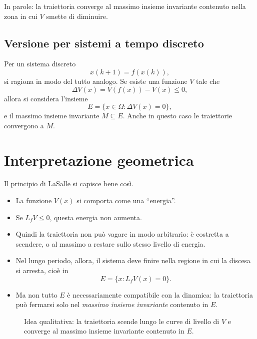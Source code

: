 \medskip

\noindent
In parole: la traiettoria converge al massimo insieme invariante contenuto nella zona in cui \(V\) smette di diminuire.

\subsection{Versione per sistemi a tempo discreto}

Per un sistema discreto
\[
x(k+1)=f(x(k)),
\]
si ragiona in modo del tutto analogo.  
Se esiste una funzione \(V\) tale che
\[
\Delta V(x)=V(f(x))-V(x)\le 0,
\]
allora si considera l'insieme
\[
E=\{x\in\Omega : \Delta V(x)=0\},
\]
e il massimo insieme invariante \(M\subseteq E\).  
Anche in questo caso le traiettorie convergono a \(M\).

\section{Interpretazione geometrica}

Il principio di LaSalle si capisce bene così.

\begin{itemize}
    \item La funzione \(V(x)\) si comporta come una ``energia''.
    \item Se \(L_fV\le 0\), questa energia non aumenta.
    \item Quindi la traiettoria non può vagare in modo arbitrario: è costretta a scendere, o al massimo a restare sullo stesso livello di energia.
    \item Nel lungo periodo, allora, il sistema deve finire nella regione in cui la discesa si arresta, cioè in
    \[
    E=\{x:L_fV(x)=0\}.
    \]
    \item Ma non tutto \(E\) è necessariamente compatibile con la dinamica: la traiettoria può fermarsi solo nel \emph{massimo insieme invariante} contenuto in \(E\).
\end{itemize}

\begin{figure}[h!]
\centering
{}
\caption{Idea qualitativa: la traiettoria scende lungo le curve di livello di \(V\) e converge al massimo insieme invariante contenuto in \(E\).}
\end{figure}

